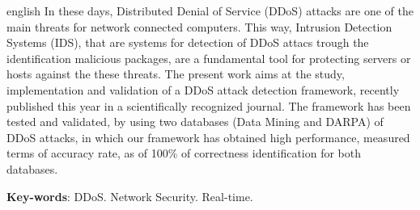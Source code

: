 \begin{resumo}[Abstract]
 \begin{otherlanguage*}{english}
 	In these days, Distributed Denial of Service (DDoS) attacks are one of the main threats for network connected computers. This way, Intrusion Detection Systems (IDS), that are systems for  detection of DDoS attacs trough the identification malicious packages, are a fundamental tool for protecting servers or hosts against the these threats. The present work aims at the study, implementation and validation of a DDoS attack detection framework, recently published this year in a scientifically recognized journal. The framework has been tested and validated, by using two databases (Data Mining and DARPA) of DDoS attacks, in which our framework has obtained high performance, measured terms of accuracy rate, as of 100\% of correctness identification for both databases.
   \noindent 
  
   \textbf{Key-words}: DDoS. Network Security. Real-time. 
 \end{otherlanguage*}
\end{resumo}